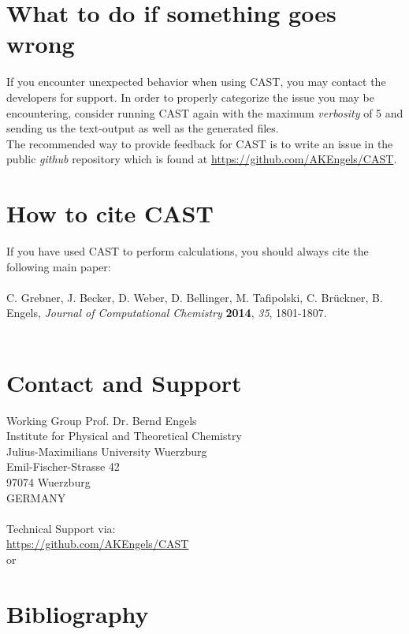 \documentclass[10pt,a4paper]{article} %
\begin{document}
	\newpage
	\section{What to do if something goes wrong}
	If you encounter unexpected behavior when using \ac{CAST}, you may contact the developers for support. In order to properly categorize the issue you may be encountering, consider running \ac{CAST} again with the maximum \textit{verbosity} of 5 and sending us the text-output as well as the generated files. \\

    The recommended way to provide feedback for CAST is to write an issue in the public \textit{github} repository which is found at \url{https://github.com/AKEngels/CAST}.
    

	\newpage
	\section{How to cite CAST}

	If you have used \ac{CAST} to perform calculations, you should always cite the following main paper:\\~\\
	C. Grebner, J. Becker, D. Weber, D. Bellinger, M. Tafipolski, C. Br\"uckner,
	B. Engels, \textit{Journal of Computational Chemistry} \textbf{2014}, \textit{35}, 1801-1807.~\\~\\
	

	\newpage
	\section{Contact and Support}
	\label{sec:contact}

	Working Group Prof. Dr. Bernd Engels\\
	Institute for Physical and Theoretical Chemistry\\
	Julius-Maximilians University Wuerzburg\\
	Emil-Fischer-Strasse 42\\
	97074 Wuerzburg\\
	GERMANY\\~\\
	Technical Support via:\\
	\url{https://github.com/AKEngels/CAST}\\
	or\\

\newpage
\section{Bibliography}
\printbibliography
\end{document}
